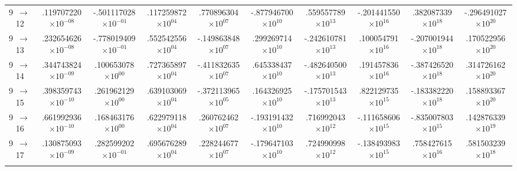 \documentclass[reviewcopy]{elsarticle}
\begin{document}
\begin{landscape}
\begin{longtable}{lccccccccc}
 9~$\to$~ 12 &  .119707220$\times10^{-08}$ &  -.501117028$\times10^{-01}$ &   .117259872$\times10^{ 04}$ &   .770896304$\times10^{ 07}$ &  -.877946700$\times10^{ 10}$ &   .559557789$\times10^{ 13}$ &  -.201441550$\times10^{ 16}$ &   .382087339$\times10^{ 18}$ &  -.296491027$\times10^{ 20}$ \\
 9~$\to$~ 13 &  .232654626$\times10^{-08}$ &  -.778019409$\times10^{-01}$ &   .552542556$\times10^{ 04}$ &  -.149863848$\times10^{ 07}$ &   .299269714$\times10^{ 10}$ &  -.242610781$\times10^{ 13}$ &   .100054791$\times10^{ 16}$ &  -.207001944$\times10^{ 18}$ &   .170522956$\times10^{ 20}$ \\
 9~$\to$~ 14 &  .344743824$\times10^{-09}$ &   .100653078$\times10^{ 00}$ &   .727365897$\times10^{ 04}$ &  -.411832635$\times10^{ 07}$ &   .645338437$\times10^{ 10}$ &  -.482640500$\times10^{ 13}$ &   .191457836$\times10^{ 16}$ &  -.387426520$\times10^{ 18}$ &   .314726162$\times10^{ 20}$ \\
 9~$\to$~ 15 &  .398359743$\times10^{-10}$ &   .261962129$\times10^{ 00}$ &   .639103069$\times10^{ 04}$ &  -.372113965$\times10^{ 05}$ &   .164326925$\times10^{ 10}$ &  -.175701543$\times10^{ 13}$ &   .822129735$\times10^{ 15}$ &  -.183382220$\times10^{ 18}$ &   .158893367$\times10^{ 20}$ \\
 9~$\to$~ 16 &  .661992936$\times10^{-10}$ &   .168463176$\times10^{ 00}$ &   .622979118$\times10^{ 04}$ &   .260762462$\times10^{ 07}$ &  -.193191432$\times10^{ 10}$ &   .716992043$\times10^{ 12}$ &  -.111658606$\times10^{ 15}$ &  -.835007803$\times10^{ 15}$ &   .142876339$\times10^{ 19}$ \\
 9~$\to$~ 17 &  .130875093$\times10^{-09}$ &   .282599202$\times10^{-01}$ &   .695676289$\times10^{ 04}$ &   .228244677$\times10^{ 07}$ &  -.179647103$\times10^{ 10}$ &   .724990998$\times10^{ 12}$ &  -.138493983$\times10^{ 15}$ &   .758427615$\times10^{ 16}$ &   .581503239$\times10^{ 18}$ \\[3pt]
\hline \\
\end{longtable}
\normalsize
\renewcommand{\thefootnote}{\arabic{footnote}}
\renewcommand{\arraystretch}{1.0}
\end{landscape}

\newpage
\end{document}
